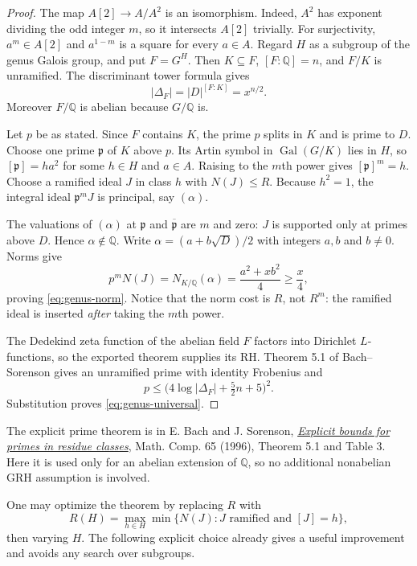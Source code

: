 \begin{proof}
The map $A[2]\to A/A^2$ is an isomorphism. Indeed, $A^2$ has exponent
dividing the odd integer $m$, so it intersects $A[2]$ trivially. For
surjectivity, $a^m\in A[2]$ and $a^{1-m}$ is a square for every $a\in A$.
Regard $H$ as a subgroup of the genus Galois group, and put $F=G^H$.
Then $K\subseteq F$, $[F:\mathbb Q]=n$, and $F/K$ is unramified.
The discriminant tower formula gives
\[
                   |\Delta_F|=|D|^{[F:K]}=x^{n/2}.
\]
Moreover $F/\mathbb Q$ is abelian because $G/\mathbb Q$ is.

Let $p$ be as stated. Since $F$ contains $K$, the prime $p$ splits in
$K$ and is prime to $D$. Choose one prime $\mathfrak p$ of $K$ above $p$.
Its Artin symbol in $\operatorname{Gal}(G/K)$ lies in $H$, so
$[\mathfrak p]=h a^2$ for some $h\in H$ and $a\in A$. Raising to the
$m$th power gives $[\mathfrak p]^m=h$. Choose a ramified ideal $J$ in
class $h$ with $N(J)\le R$. Because $h^2=1$, the integral ideal
$\mathfrak p^mJ$ is principal, say $(\alpha)$.

The valuations of $(\alpha)$ at $\mathfrak p$ and
$\overline{\mathfrak p}$ are $m$ and zero: $J$ is supported only at
primes above $D$. Hence $\alpha\notin\mathbb Q$. Write
$\alpha=(a+b\sqrt D)/2$ with integers $a,b$ and $b\ne0$. Norms give
\[
 p^mN(J)=N_{K/\mathbb Q}(\alpha)
        =\frac{a^2+xb^2}{4}\ge\frac x4,
\]
proving \eqref{eq:genus-norm}. Notice that the norm cost is $R$, not
$R^m$: the ramified ideal is inserted \emph{after} taking the $m$th power.

The Dedekind zeta function of the abelian field $F$ factors into
Dirichlet $L$-functions, so the exported theorem supplies its RH.
Theorem 5.1 of Bach--Sorenson gives an unramified prime with identity
Frobenius and
\[
 p\le\bigl(4\log|\Delta_F|+\tfrac52n+5\bigr)^2.
\]
Substitution proves \eqref{eq:genus-universal}.
\end{proof}

The explicit prime theorem is in E. Bach and J. Sorenson,
\href{https://doi.org/10.1090/S0025-5718-96-00763-6}{\emph{Explicit bounds
for primes in residue classes}}, Math. Comp. 65 (1996), Theorem 5.1
and Table 3. Here it is used only for an abelian extension of
$\mathbb Q$, so no additional nonabelian GRH assumption is involved.

One may optimize the theorem by replacing $R$ with
\[
 R(H)=\max_{h\in H}\min\{N(J):J\text{ ramified and }[J]=h\},
\]
then varying $H$. The following explicit choice already gives a useful
improvement and avoids any search over subgroups.


